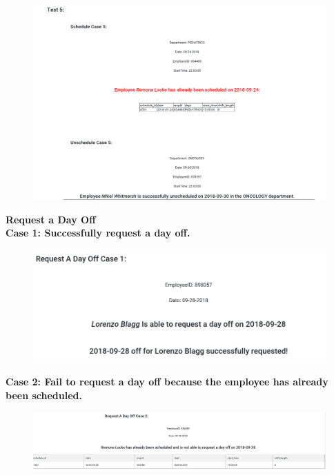 \documentclass[11pt]{article}
\makeatletter
\def\maxwidth{\ifdim\Gin@nat@width>\linewidth\linewidth
    \else\Gin@nat@width\fi}
\let\Oldincludegraphics\includegraphics
\renewcommand{\includegraphics}[1]{\Oldincludegraphics[width=.8\maxwidth]{#1}}
\makeatother
\begin{document}
\begin{figure}[H]
        \centering
        \includegraphics{../hw9/8.png}
        \caption{}
    \end{figure}

    \textbf{Request a Day Off}\\

\noindent    \textbf{Case 1: Successfully request a day off.}

\begin{figure}[H]
        \centering
        \includegraphics{4.png}
        \caption{}
    \end{figure}

\noindent    \textbf{Case 2: Fail to request a day off because the employee has already been scheduled.}

\begin{figure}[H]
        \centering
        \includegraphics{5.png}
        \caption{}
    \end{figure}
\end{document}
